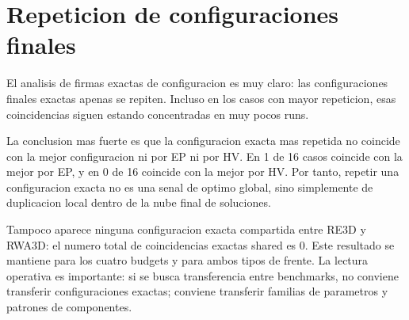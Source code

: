 \documentclass[11pt,a4paper]{article}
\begin{document}
\begin{landscape}
{}

\end{landscape}

\section{Repeticion de configuraciones finales}

El analisis de firmas exactas de configuracion es muy claro: las configuraciones finales exactas apenas se repiten. Incluso en los casos con mayor repeticion, esas coincidencias siguen estando concentradas en muy pocos runs.

La conclusion mas fuerte es que la configuracion exacta mas repetida no coincide con la mejor configuracion ni por EP ni por HV. En 1 de 16 casos coincide con la mejor por EP, y en 0 de 16 coincide con la mejor por HV. Por tanto, repetir una configuracion exacta no es una senal de optimo global, sino simplemente de duplicacion local dentro de la nube final de soluciones.

Tampoco aparece ninguna configuracion exacta compartida entre RE3D y RWA3D: el numero total de coincidencias exactas shared es 0. Este resultado se mantiene para los cuatro budgets y para ambos tipos de frente. La lectura operativa es importante: si se busca transferencia entre benchmarks, no conviene transferir configuraciones exactas; conviene transferir familias de parametros y patrones de componentes.
\end{document}
